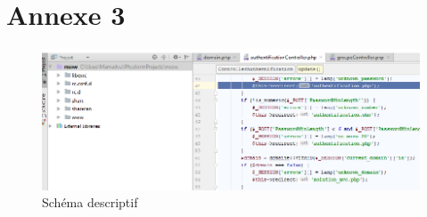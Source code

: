 \section{Annexe 3}
\begin{figure}[!h]
\begin{center}
\includegraphics[width=15cm]{image/page_phpstorm.png}
\end{center}
\caption{Schéma descriptif}
\end{figure}